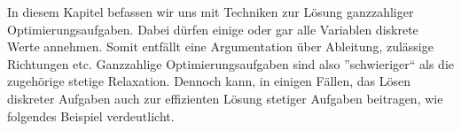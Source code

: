 In diesem Kapitel befassen wir uns mit Techniken zur Lösung ganzzahliger Optimierungsaufgaben. Dabei dürfen einige oder gar alle Variablen diskrete Werte annehmen.
Somit entfällt eine Argumentation über Ableitung, zulässige Richtungen etc. Ganzzahlige Optimierungsaufgaben sind also ''schwieriger`` als die zugehörige stetige Relaxation. Dennoch kann, in einigen Fällen, das Lösen diskreter Aufgaben auch zur effizienten Lösung stetiger Aufgaben beitragen, wie folgendes Beispiel verdeutlicht.